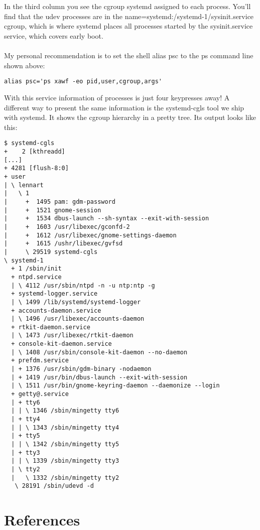 \documentclass[titlepage]{article}
\begin{document}
\\
\\
In the third column you see the cgroup systemd assigned to each process. You'll find that the udev processes are in the name=systemd:/systemd-1/sysinit.service cgroup, which is where systemd places all processes started by the sysinit.service service, which covers early boot.
\\
\\
\newpage
My personal recommendation is to set the shell alias psc to the ps command line shown above:
\begin{lstlisting}
alias psc='ps xawf -eo pid,user,cgroup,args'
\end{lstlisting}
With this service information of processes is just four keypresses away! A different way to present the same information is the systemd-cgls tool we ship with systemd. It shows the cgroup hierarchy in a pretty tree. Its output looks like this:
\begin{lstlisting}
$ systemd-cgls
+    2 [kthreadd]
[...]
+ 4281 [flush-8:0]
+ user
| \ lennart
|   \ 1
|     +  1495 pam: gdm-password
|     +  1521 gnome-session
|     +  1534 dbus-launch --sh-syntax --exit-with-session
|     +  1603 /usr/libexec/gconfd-2
|     +  1612 /usr/libexec/gnome-settings-daemon
|     +  1615 /ushr/libexec/gvfsd
|     \ 29519 systemd-cgls
\ systemd-1
  + 1 /sbin/init
  + ntpd.service
  | \ 4112 /usr/sbin/ntpd -n -u ntp:ntp -g
  + systemd-logger.service
  | \ 1499 /lib/systemd/systemd-logger
  + accounts-daemon.service
  | \ 1496 /usr/libexec/accounts-daemon
  + rtkit-daemon.service
  | \ 1473 /usr/libexec/rtkit-daemon
  + console-kit-daemon.service
  | \ 1408 /usr/sbin/console-kit-daemon --no-daemon
  + prefdm.service
  | + 1376 /usr/sbin/gdm-binary -nodaemon
  | + 1419 /usr/bin/dbus-launch --exit-with-session
  | \ 1511 /usr/bin/gnome-keyring-daemon --daemonize --login
  + getty@.service
  | + tty6
  | | \ 1346 /sbin/mingetty tty6
  | + tty4
  | | \ 1343 /sbin/mingetty tty4
  | + tty5
  | | \ 1342 /sbin/mingetty tty5
  | + tty3
  | | \ 1339 /sbin/mingetty tty3
  | \ tty2
  |   \ 1332 /sbin/mingetty tty2
   \ 28191 /sbin/udevd -d
\end{lstlisting}
\section{References}
\nocite{*}


\end{document}
